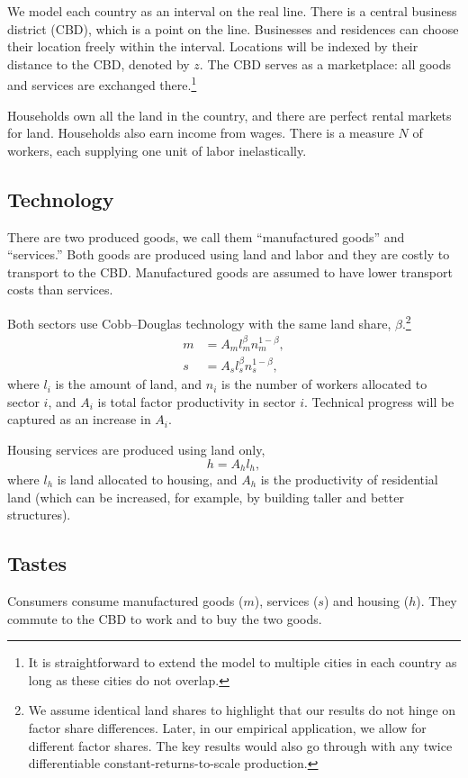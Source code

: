 \documentclass[12pt]{article}
\begin{document}
We model each country as an interval on the real line. There is a central business district (CBD), which is a point on the line. Businesses and residences can choose their location freely within the interval. Locations will be indexed by their distance to the CBD, denoted by $z$. The CBD serves as a marketplace: all goods and services are exchanged there.\footnote{It is straightforward to extend the model to multiple cities in each country as long as these cities do not overlap.}

Households own all the land in the country, and there are perfect rental markets for land. Households also earn income from wages. There is a measure $N$ of workers, each supplying one unit of labor inelastically.

\subsection{Technology}
There are two produced goods, we call them ``manufactured goods'' and ``services.'' Both goods are produced using land and labor and they are costly to transport to the CBD. Manufactured goods are assumed to have lower transport costs than services.

Both sectors use Cobb--Douglas technology with the same land share, $\beta$.\footnote{We assume identical land shares to highlight that our results do not hinge on factor share differences. Later, in our empirical application, we allow for different factor shares. The key results would also go through with any twice differentiable constant-returns-to-scale production.}
\begin{align*}
m&=A_ml_m^\beta n_m^{1-\beta},\\
s&=A_sl_s^\beta n_s^{1-\beta},
\end{align*}
where $l_i$ is the amount of land, and $n_i$ is the number of workers allocated to sector $i$, and $A_i$ is total factor productivity in sector $i$. Technical progress will be captured as an increase in $A_i$.

Housing services are produced using land only,
\[
 h=A_hl_h,
\]
where $l_h$ is land allocated to housing, and $A_h$ is the productivity of residential land (which can be increased, for example, by building taller and better structures).

\subsection{Tastes}
Consumers consume manufactured goods ($m$), services ($s$) and housing ($h$). They commute to the CBD to work and to buy the two goods.
\end{document}
